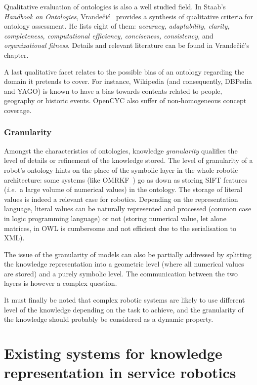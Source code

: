 \documentclass[a4paper, twocolumn]{article}
\newcommand{\ie}{{\textit{i.e.\ }}}
\begin{document}
Qualitative evaluation of ontologies is also a well studied field. In Staab's
{\it Handbook on Ontologies}, Vrande{\v{c}}i{\'c}~\cite{Vrandevcic2009}
provides a synthesis of qualitative criteria for ontology assessment.  He lists
eight of them: \emph{accuracy, adaptability, clarity, completeness,
computational efficiency, conciseness, consistency,} and
\emph{organizational fitness}. Details and relevant literature can be found
in Vrande{\v{c}}i{\'c}'s chapter.

A last qualitative facet relates to the possible bias of an ontology
regarding the domain it pretends to cover. For instance, Wikipedia (and
consequently, DBPedia and YAGO) is known to have a bias towards contents
related to people, geography or historic events. {\sc OpenCYC} also suffer of
non-homogeneous concept coverage.

\subsubsection{Granularity}

Amongst the characteristics of ontologies, knowledge \emph{granularity}
qualifies the level of details or refinement of the knowledge stored. The level
of granularity of a robot's ontology hints on the place of the symbolic layer
in the whole robotic architecture: some systems (like OMRKF~\cite{Suh2007}) go
as down as storing SIFT features (\ie a large volume of numerical values) in
the ontology. The storage of literal values is indeed a relevant case for
robotics. Depending on the representation language, literal values can be
naturally represented and processed (common case in logic programming language)
or not (storing numerical value, let alone matrices, in OWL is cumbersome and
not efficient due to the serialisation to XML).

The issue of the granularity of models can also be partially addressed by
splitting the knowledge representation into a geometric level (where all
numerical values are stored) and a purely symbolic level. The communication
between the two layers is however a complex question.

It must finally be noted that complex robotic systems are likely to use
different level of the knowledge depending on the task to achieve, and the
granularity of the knowledge should probably be considered as a dynamic
property.


\section{Existing systems for knowledge representation in service robotics}
\label{sect|surveyed-systems}
\end{document}
